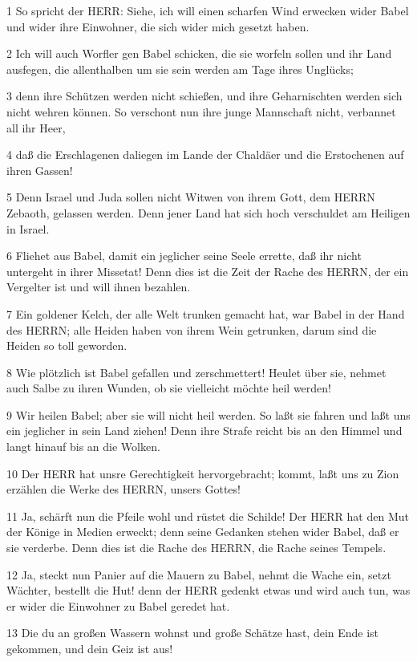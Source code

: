 \par 1 So spricht der HERR: Siehe, ich will einen scharfen Wind erwecken wider Babel und wider ihre Einwohner, die sich wider mich gesetzt haben.
\par 2 Ich will auch Worfler gen Babel schicken, die sie worfeln sollen und ihr Land ausfegen, die allenthalben um sie sein werden am Tage ihres Unglücks;
\par 3 denn ihre Schützen werden nicht schießen, und ihre Geharnischten werden sich nicht wehren können. So verschont nun ihre junge Mannschaft nicht, verbannet all ihr Heer,
\par 4 daß die Erschlagenen daliegen im Lande der Chaldäer und die Erstochenen auf ihren Gassen!
\par 5 Denn Israel und Juda sollen nicht Witwen von ihrem Gott, dem HERRN Zebaoth, gelassen werden. Denn jener Land hat sich hoch verschuldet am Heiligen in Israel.
\par 6 Fliehet aus Babel, damit ein jeglicher seine Seele errette, daß ihr nicht untergeht in ihrer Missetat! Denn dies ist die Zeit der Rache des HERRN, der ein Vergelter ist und will ihnen bezahlen.
\par 7 Ein goldener Kelch, der alle Welt trunken gemacht hat, war Babel in der Hand des HERRN; alle Heiden haben von ihrem Wein getrunken, darum sind die Heiden so toll geworden.
\par 8 Wie plötzlich ist Babel gefallen und zerschmettert! Heulet über sie, nehmet auch Salbe zu ihren Wunden, ob sie vielleicht möchte heil werden!
\par 9 Wir heilen Babel; aber sie will nicht heil werden. So laßt sie fahren und laßt uns ein jeglicher in sein Land ziehen! Denn ihre Strafe reicht bis an den Himmel und langt hinauf bis an die Wolken.
\par 10 Der HERR hat unsre Gerechtigkeit hervorgebracht; kommt, laßt uns zu Zion erzählen die Werke des HERRN, unsers Gottes!
\par 11 Ja, schärft nun die Pfeile wohl und rüstet die Schilde! Der HERR hat den Mut der Könige in Medien erweckt; denn seine Gedanken stehen wider Babel, daß er sie verderbe. Denn dies ist die Rache des HERRN, die Rache seines Tempels.
\par 12 Ja, steckt nun Panier auf die Mauern zu Babel, nehmt die Wache ein, setzt Wächter, bestellt die Hut! denn der HERR gedenkt etwas und wird auch tun, was er wider die Einwohner zu Babel geredet hat.
\par 13 Die du an großen Wassern wohnst und große Schätze hast, dein Ende ist gekommen, und dein Geiz ist aus!
